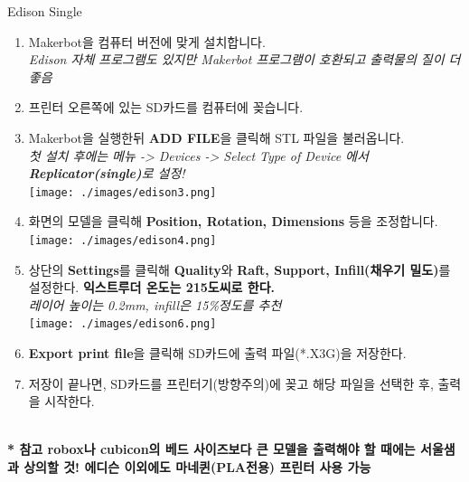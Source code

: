\documentclass[a0paper,portrait]{baposter}
\begin{document}
\begin{poster}
\begin{posterbox}[name=edison,column=2,below=printer, above=bottom]{Edison Single}
\begin{enumerate}
	\item \small Makerbot을 컴퓨터 버전에 맞게 설치합니다.\\
	\textit{Edison 자체 프로그램도 있지만 Makerbot 프로그램이 호환되고 출력물의 질이 더 좋음}
	\item 프린터 오른쪽에 있는  SD카드를 컴퓨터에 꽂습니다.
	\item Makerbot을 실행한뒤  \textbf{ADD FILE}을  클릭해 STL 파일을 불러옵니다. \\
	\footnotesize \textit{첫 설치 후에는 메뉴 -> Devices -> Select Type of Device 에서 \textbf{Replicator(single)}로 설정! } \\
	\texttt{[image: ./images/edison3.png]}
	\item 화면의 모델을 클릭해 \textbf{Position, Rotation, Dimensions} 등을 조정합니다. \\
	\texttt{[image: ./images/edison4.png]}
	\item 상단의 \textbf{Settings}를 클릭해  \textbf{Quality}와 \textbf{Raft, Support, Infill(채우기 밀도)}를 설정한다. \textbf{익스트루더 온도는 215도씨로 한다.}\\
	\footnotesize \textit{레이어 높이는 0.2mm, infill은 15\%정도를 추천} \\
	\texttt{[image: ./images/edison6.png]}
	\item \textbf{Export print file}을 클릭해 SD카드에 출력 파일(*.X3G)을 저장한다.
	\item 저장이 끝나면, SD카드를 프린터기(방향주의)에 꽂고 해당 파일을 선택한 후, 출력을 시작한다.
\end{enumerate}
\textbf{ \\ * 참고 robox나 cubicon의 베드 사이즈보다 큰 모델을 출력해야 할 때에는 서울샘과 상의할 것! 에디슨 이외에도 마네퀸(PLA전용) 프린터 사용 가능}
\end{posterbox}


\end{poster}
\end{document}

